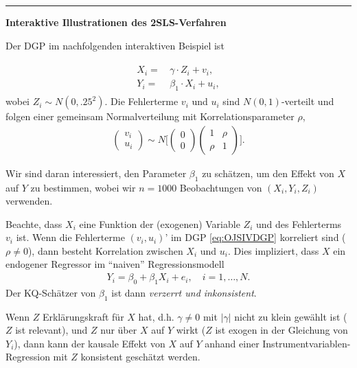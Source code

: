 \documentclass[
  a4paper,
  DIV=11,
  oneside]{scrreprt}
\begin{document}
\begin{center}\rule{0.5\linewidth}{0.5pt}\end{center}

\textbf{Interaktive Illustrationen des 2SLS-Verfahren}

Der DGP im nachfolgenden interaktiven Beispiel ist

\begin{align}
  \begin{split}
    X_i =&\, \gamma \cdot Z_i + v_i,\\
    Y_i =&\, \beta_1 \cdot X_i + u_i,
  \end{split}
  \label{eq:OJSIVDGP}
\end{align} wobei \(Z_i \sim N(0, .25^2)\). Die Fehlerterme \(v_i\) und
\(u_i\) sind \(N(0,1)\)-verteilt und folgen einer gemeinsam
Normalverteilung mit Korrelationsparameter \(\rho\), \begin{align}
\begin{pmatrix}
v_i \\ u_i
\end{pmatrix}
\sim N
\bigg[
\begin{pmatrix}
0 \\ 0
\end{pmatrix}
\begin{pmatrix}
1 & \rho \\
\rho & 1
\end{pmatrix}
\bigg].
\end{align}

Wir sind daran interessiert, den Parameter \(\beta_1\) zu schätzen, um
den Effekt von \(X\) auf \(Y\) zu bestimmen, wobei wir \(n=1000\)
Beobachtungen von \((X_i, Y_i, Z_i)\) verwenden.

Beachte, dass \(X_i\) eine Funktion der (exogenen) Variable \(Z_i\) und
des Fehlerterms \(v_i\) ist. Wenn die Fehlerterme \((v_i, u_i)’\) im DGP
\eqref{eq:OJSIVDGP} korreliert sind (\(\rho\neq0\)), dann besteht
Korrelation zwischen \(X_i\) und \(u_i\). Dies impliziert, dass \(X\)
ein endogener Regressor im ``naiven'' Regressionsmodell \begin{align}
Y_i = \beta_0 + \beta_1 X_i + e_i, \quad i = 1,\dots,N.
\end{align} Der KQ-Schätzer von \(\beta_1\) ist dann \emph{verzerrt und
inkonsistent}.

Wenn \(Z\) Erklärungskraft für \(X\) hat, d.h. \(\gamma\neq0\) mit
\(|\gamma|\) nicht zu klein gewählt ist (\(Z\) ist relevant), und \(Z\)
nur über \(X\) auf \(Y\) wirkt (\(Z\) ist exogen in der Gleichung von
\(Y_i\)), dann kann der kausale Effekt von \(X\) auf \(Y\) anhand einer
Instrumentvariablen-Regression mit \(Z\) konsistent geschätzt werden.
\end{document}
